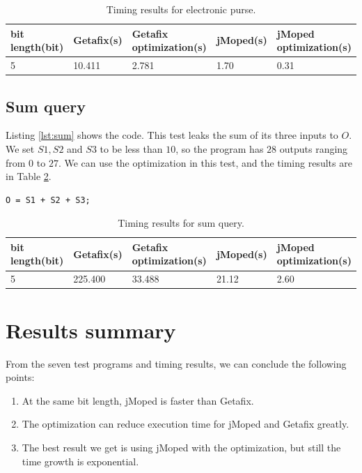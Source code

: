 \begin{table}[!h]
\centering
\begin{tabular}{|l|l|l|l|l|}
\hline
{bit length(bit)} & Getafix(s) & {Getafix optimization(s)} & jMoped(s) & {jMoped optimization(s)} \\ \hline
{5} & {10.411} & {2.781} & {1.70} & {0.31} \\ \hline
\end{tabular}
\caption{Timing results for electronic purse.}
\label{tbl:electronic}
\end{table}

\subsection{Sum query}
Listing \ref{lst:sum} shows the code. This test leaks the sum of its three inputs to $O$. We set $S1, S2$ and $S3$ to be less than $10$, so the program has $28$ outputs ranging from $0$ to $27$. We can use the optimization in this test, and the timing results are in Table \ref{tbl:sum}.

\lstset{language=C}  
\begin{lstlisting}[float=!h, caption={Sum query test program.},label=lst:sum]
O = S1 + S2 + S3;
\end{lstlisting}

\begin{table}[!h]
\centering
\begin{tabular}{|l|l|l|l|l|}
\hline
{bit length(bit)} & Getafix(s) & {Getafix optimization(s)} & jMoped(s) & {jMoped optimization(s)} \\ \hline
5 & 225.400 & 33.488 & 21.12 & 2.60	\\ \hline
\end{tabular}
\caption{Timing results for sum query.}
\label{tbl:sum}
\end{table}

\section{Results summary}
From the seven test programs and timing results, we can conclude the following points:
\begin{enumerate}
\item At the same bit length, jMoped is faster than Getafix. 
\item The optimization can reduce execution time for jMoped and Getafix greatly.
\item The best result we get is using jMoped with the optimization, but still the time growth is exponential.
\end{enumerate}

